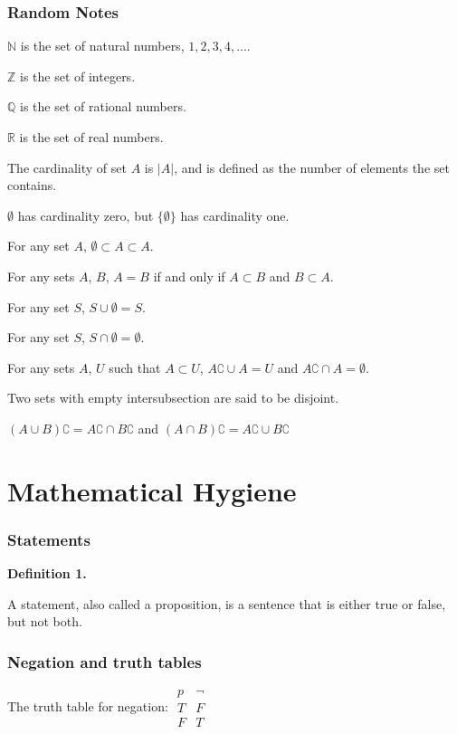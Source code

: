\subsubsection*{Random Notes}
\par\noindent $\mathbb{N}$ is the set of natural numbers, $1,2,3,4,\ldots$.
\par\noindent $\mathbb{Z}$ is the set of integers.
\par\noindent $\mathbb{Q}$ is the set of rational numbers.
\par\noindent $\mathbb{R}$ is the set of real numbers.
\par\noindent The cardinality of set $A$ is $|A|$, and is defined as the number of elements the set contains.
\par\noindent $\emptyset{}$ has cardinality zero, but $\{\emptyset\}$ has cardinality one.
\par\noindent For any set $A$, $\emptyset\subset{}A\subset{}A$.
\par\noindent For any sets $A$, $B$, $A=B$ if and only if $A\subset{}B$ and $B\subset{}A$.
\par\noindent For any set $S$, $S\cup\emptyset{}=S$.
\par\noindent For any set $S$, $S\cap\emptyset{}=\emptyset$.
\par\noindent For any sets $A$, $U$ such that $A\subset{}U$, $A\complement\cup{}A=U$ and $A\complement\cap{}A=\emptyset$.
\par\noindent Two sets with empty intersubsection are said to be disjoint.
\par\noindent $(A\cup{}B)\complement{}=A\complement\cap{}B\complement$ and $(A\cap{}B)\complement{}=A\complement\cup{}B\complement$

\section*{Mathematical Hygiene}
\subsubsection*{Statements}
\textbf{Definition 1.}\\
\par\noindent A statement, also called a proposition, is a sentence that is either true or false, but not both.
\subsubsection*{Negation and truth tables}
\par\noindent The truth table for negation: $\begin{array}{c||c} p & \neg \\ \hline T & F \\ F & T \end{array}$
